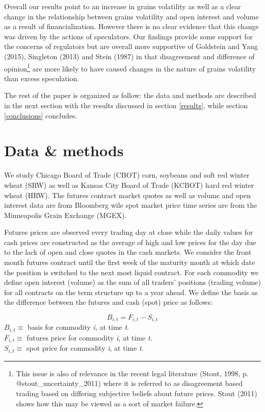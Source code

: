 \documentclass[]{elsarticle} %
\begin{document}
Overall our results point to an increase in grains volatility as well as
a clear change in the relationship between grains volatility and open
interest and volume as a result of financialization. However there is no
clear evidence that this change was driven by the actions of
speculators. Our findings provide some support for the concerns of
regulators but are overall more supportive of Goldstein and Yang (2015),
Singleton (2013) and Stein (1987) in that disagreement and difference of
opinion\footnote{This issue is also of relevance in the recent legal
  literature (Stout, 1998, p. @stout\_uncertainty\_2011) where it is
  referred to as disagreement based trading based on differing
  subjective beliefs about future prices. Stout (2011) shows how this
  may be viewed as a sort of market failure.} are more likely to have
caused changes in the nature of grains volatility than excess
speculation.

The rest of the paper is organized as follow: the data and methods are
described in the next section with the results discussed in section
\ref{results}, while section \ref{conclusions} concludes.

\newpage

\hypertarget{data-methods}{%
\section{Data \& methods}\label{data-methods}}

We study Chicago Board of Trade (CBOT) corn, soybeans and soft red
winter wheat (SRW) as well as Kansas City Board of Trade (KCBOT) hard
red winter wheat (HRW). The futures contract market quotes as well as
volume and open interest data are from Bloomberg wile spot market price
time series are from the Minneapolis Grain Exchange (MGEX).

Futures prices are observed every trading day at close while the daily
values for cash prices are constructed as the average of high and low
prices for the day due to the lack of open and close quotes in the cash
markets. We consider the front month futures contract until the first
week of the maturity month at which date the position is switched to the
next most liquid contract. For each commodity we define open interest
(volume) as the sum of all traders' positions (trading volume) for all
contracts on the term structure up to a year ahead. We define the basis
as the difference between the futures and cash (spot) price as follows:

\[B_{i, t}=F_{i, t}-S_{i, t}\] \(B_{i, t}\equiv\) basis for commodity
\textit{i}, at time \textit{t}.\\
\(F_{i, t}\equiv\) futures price for commodity \textit{i}, at time
\textit{t}.\\
\(S_{i, t}\equiv\) spot price for commodity \textit{i}, at time
\textit{t}.
\end{document}
